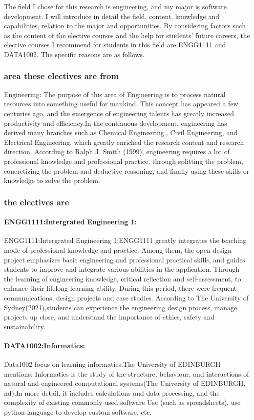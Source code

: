 \documentclass[../draft.tex]{subfiles}
\begin{document}
The field I chose for this research is engineering, and my major is software development. I will introduce in detail the field, content, knowledge and capabilities, relation to the major and opportunities. By considering factors such as the content of the elective courses and the help for students' future careers, the elective courses I recommend for students in this field are ENGG1111 and DATA1002. The specific reasons are as follows.
\subsubsection{area these electives are from}
Engineering: The purpose of this area of Engineering is to process natural resources into something useful for mankind. This concept has appeared a few centuries ago, and 
the emergence of engineering talents has greatly increased productivity and efficiency.In the continuous development, engineering has derived many branches such as Chemical Engineering., Civil Engineering, and Electrical Engineering, which greatly enriched the research content and research direction. According to Ralph J. Smith (1999), engineering requires a lot of professional knowledge and professional practice, through splitting the problem, concretizing the problem and deductive reasoning, and finally using these skills or knowledge to solve the problem.
\subsubsection{the electives are}
\paragraph{ENGG1111:Intergrated Engineering 1:} 
ENGG1111:Intergrated Engineering 1:ENGG1111 greatly integrates the teaching mode of professional knowledge and practice. Among them, the open design project emphasizes basic engineering and professional practical skills, and guides students to improve and integrate various abilities in the application. Through the learning of engineering knowledge, critical reflection and self-assessment, to enhance their lifelong learning ability. During this period, there were frequent communications, design projects and case studies. According to The University of Sydney(2021),students can experience the engineering design process, manage projects up close, and understand the importance of ethics, safety and sustainability.
\paragraph{DATA1002:Informatics:}
Data1002 focus on learning informatics.The University of EDINBURGH mentions: Informatics is the study of the structure, behaviour, and interactions of natural and engineered computational systems(The University of EDINBURGH, nd).In more detail, it includes calculations and data processing, and the complexity of existing commonly used software Use (such as spreadsheets), use python language to develop custom software, etc. 
\end{document}
